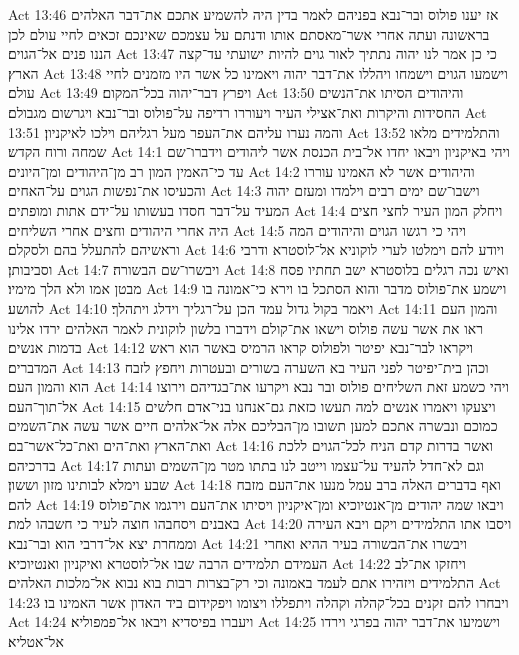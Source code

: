 Act 13:46  אז יענו פולוס ובר־נבא בפניהם לאמר בדין היה להשמיע אתכם את־דבר האלהים בראשונה ועתה אחרי אשר־מאסתם אותו ודנתם על עצמכם שאינכם זכאים לחיי עולם לכן הננו פנים אל־הגוים׃
Act 13:47  כי כן אמר לנו יהוה נתתיך לאור גוים להיות ישועתי עד־קצה הארץ׃
Act 13:48  וישמעו הגוים וישמחו ויהללו את־דבר יהוה ויאמינו כל אשר היו מזמנים לחיי עולם׃
Act 13:49  ויפרץ דבר־יהוה בכל־המקום׃
Act 13:50  והיהודים הסיתו את־הנשים החסידות והיקרות ואת־אצילי העיר ויעוררו רדיפה על־פולוס ובר־נבא ויגרשום מגבולם׃
Act 13:51  והמה נערו עליהם את־העפר מעל רגליהם וילכו לאיקניון׃
Act 13:52  והתלמידים מלאו שמחה ורוח הקדש׃
Act 14:1  ויהי באיקניון ויבאו יחדו אל־בית הכנסת אשר ליהודים וידברו־שם עד כי־האמין המון רב מן־היהודים ומן־היונים׃
Act 14:2  והיהודים אשר לא האמינו עוררו והכעיסו את־נפשות הגוים על־האחים׃
Act 14:3  וישבו־שם ימים רבים וילמדו ומעזם יהוה המעיד על־דבר חסדו בעשותו על־ידם אתות ומופתים׃
Act 14:4  ויחלק המון העיר לחצי חצים היה אחרי היהודים וחצים אחרי השליחים׃
Act 14:5  ויהי כי רגשו הגוים והיהודים המה וראשיהם להתעלל בהם ולסקלם׃
Act 14:6  ויודע להם וימלטו לערי לוקוניא אל־לוסטרא ודרבי וסביבותן׃
Act 14:7  ויבשרו־שם הבשורה׃
Act 14:8  ואיש נכה רגלים בלוסטרא ישב תחתיו פסח מבטן אמו ולא הלך מימיו׃
Act 14:9  וישמע את־פולוס מדבר והוא הסתכל בו וירא כי־אמונה בו להושע׃
Act 14:10  ויאמר בקול גדול עמד הכן על־רגליך וידלג ויתהלך׃
Act 14:11  והמון העם ראו את אשר עשה פולוס וישאו את־קולם וידברו בלשון לוקונית לאמר האלהים ירדו אלינו בדמות אנשים׃
Act 14:12  ויקראו לבר־נבא יפיטר ולפולוס קראו הרמיס באשר הוא ראש המדברים׃
Act 14:13  וכהן בית־יפיטר לפני העיר בא השערה בשורים ובעטרות ויחפץ לזבח הוא והמון העם׃
Act 14:14  ויהי כשמע זאת השליחים פולוס ובר נבא ויקרעו את־בגדיהם וירוצו אל־תוך־העם׃
Act 14:15  ויצעקו ויאמרו אנשים למה תעשו כזאת גם־אנחנו בני־אדם חלשים כמוכם ונבשרה אתכם למען תשובו מן־הבליכם אלה אל־אלהים חיים אשר עשה את־השמים ואת־הארץ ואת־הים ואת־כל־אשר־בם׃
Act 14:16  ואשר בדרות קדם הניח לכל־הגוים ללכת בדרכיהם׃
Act 14:17  וגם לא־חדל להעיד על־עצמו וייטב לנו בתתו מטר מן־השמים ועתות שבע וימלא לבותינו מזון וששון׃
Act 14:18  ואף בדברים האלה ברב עמל מנעו את־העם מזבח להם׃
Act 14:19  ויבאו שמה יהודים מן־אנטיוכיא ומן־איקניון ויסיתו את־העם וירגמו את־פולוס באבנים ויסחבהו חוצה לעיר כי חשבהו למת׃
Act 14:20  ויסבו אתו התלמידים ויקם ויבא העירה וממחרת יצא אל־דרבי הוא ובר־נבא׃
Act 14:21  ויבשרו את־הבשורה בעיר ההיא ואחרי העמידם תלמידים הרבה שבו אל־לוסטרא ואיקניון ואנטיוכיא׃
Act 14:22  ויחזקו את־לב התלמידים ויזהירו אתם לעמד באמונה וכי רק־בצרות רבות בוא נבוא אל־מלכות האלהים׃
Act 14:23  ויבחרו להם זקנים בכל־קהלה וקהלה ויתפללו ויצומו ויפקידום ביד האדון אשר האמינו בו׃
Act 14:24  ויעברו בפיסדיא ויבאו אל־פמפוליא׃
Act 14:25  וישמיעו את־דבר יהוה בפרגי וירדו אל־אטליא׃
